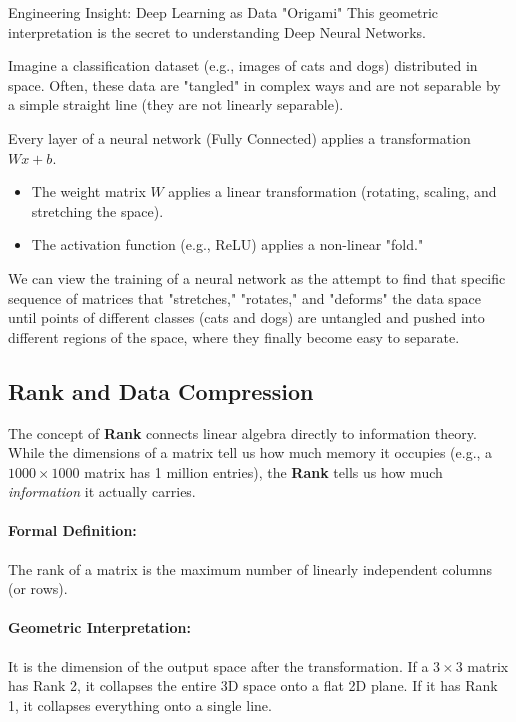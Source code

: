 \documentclass[12pt,a4paper,twoside,openright]{book}
\begin{document}
\begin{unibobox}{Engineering Insight: Deep Learning as Data "Origami"}
This geometric interpretation is the secret to understanding Deep Neural Networks.

Imagine a classification dataset (e.g., images of cats and dogs) distributed in space. Often, these data are "tangled" in complex ways and are not separable by a simple straight line (they are not linearly separable).

Every layer of a neural network (Fully Connected) applies a transformation $Wx + b$.
\begin{itemize}
    \item The weight matrix $W$ applies a linear transformation (rotating, scaling, and stretching the space).
    \item The activation function (e.g., ReLU) applies a non-linear "fold."
\end{itemize}

We can view the training of a neural network as the attempt to find that specific sequence of matrices that "stretches," "rotates," and "deforms" the data space until points of different classes (cats and dogs) are untangled and pushed into different regions of the space, where they finally become easy to separate.
\end{unibobox}

\subsection{Rank and Data Compression}

The concept of \textbf{Rank} connects linear algebra directly to information theory.
While the dimensions of a matrix tell us how much memory it occupies (e.g., a $1000 \times 1000$ matrix has 1 million entries), the \textbf{Rank} tells us how much \textit{information} it actually carries.

\paragraph{Formal Definition:} The rank of a matrix is the maximum number of linearly independent columns (or rows).
\paragraph{Geometric Interpretation:} It is the dimension of the output space after the transformation. If a $3 \times 3$ matrix has Rank 2, it collapses the entire 3D space onto a flat 2D plane. If it has Rank 1, it collapses everything onto a single line.
\end{document}
